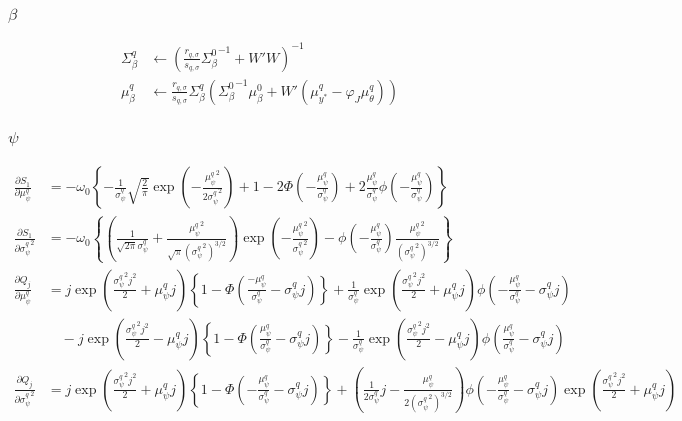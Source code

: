 \documentclass[11pt]{article}
\begin{document}
\subsubsection{$\beta$}
\begin{align*}
  \Sigma_{\beta}^{q} &\leftarrow \left(\frac{r_{q,\sigma}}{s_{q,\sigma}}{\Sigma_{\beta}^{0}}^{-1}+W'W \right)^{-1}\\
  \mu_{\beta}^{q} &\leftarrow \frac{r_{q,\sigma}}{s_{q,\sigma}}\Sigma_{\beta}^{q}\left({\Sigma_{\beta}^{0}}^{-1}\mu_{\beta}^{0}+W'\left(\mu_{y^*}^{q}-\varphi_{J}\mu_{\theta}^{q}\right)\right)
\end{align*}
\subsubsection{$\psi$}
\begin{align*}
  \frac{\partial S_{1}}{\partial \mu_{\psi}^{q}} &= -\omega_{0}\left\{-\frac{1}{\sigma_{\psi}^{q}}\sqrt{\frac{2}{\pi}}\exp\left(-\frac{{\mu_{\psi}^{q}}^{2}}{2{\sigma_{\psi}^{q}}^{2}} \right) + 1 -2\Phi\left(-\frac{\mu_{\psi}^{q}}{\sigma_{\psi}^{q}}\right)+2\frac{\mu_{\psi}^{q}}{\sigma_{\psi}^{q}}\phi\left(-\frac{\mu_{\psi}^{q}}{\sigma_{\psi}^{q}}\right) \right\}\\
  \frac{\partial S_{1}}{\partial {\sigma_{\psi}^{q}}^{2}} &= -\omega_{0}\left\{\left(\frac{1}{\sqrt{2\pi}\sigma_{\psi}^{q}}+\frac{{\mu_{\psi}^{q}}^{2}}{\sqrt{\pi}\left({\sigma_{\psi}^{q}}^{2} \right)^{3/2}} \right)\exp\left(-\frac{{\mu_{\psi}^{q}}^{2}}{{\sigma_{\psi}^{q}}^{2}} \right) -\phi\left(-\frac{\mu_{\psi}^{q}}{\sigma_{\psi}^{q}}\right)\frac{{\mu_{\psi}^{q}}^{2}}{\left({\sigma_{\psi}^{q}}^{2} \right)^{3/2}} \right\}\\
  \frac{\partial Q_{j}}{\partial \mu_{\psi}^{q}} &= j\exp\left(\frac{{\sigma_{\psi}^{q}}^{2}j^{2}}{2} +\mu_{\psi}^{q}j \right)\left\{1-\Phi\left(\frac{-\mu_{\psi}^{q}}{\sigma_{\psi}^{q}}-\sigma_{\psi}^{q}j\right) \right\}+\frac{1}{\sigma_{\psi}^{q}}\exp\left(\frac{{\sigma_{\psi}^{q}}^{2}j^{2}}{2}+\mu_{\psi}^{q}j \right)\phi\left(-\frac{\mu_{\psi}^{q}}{\sigma_{\psi}^{q}}-\sigma_{\psi}^{q}j\right)\\
  &\quad -j\exp\left(\frac{{\sigma_{\psi}^{q}}^{2}j^{2}}{2} -\mu_{\psi}^{q}j \right)\left\{1-\Phi\left(\frac{\mu_{\psi}^{q}}{\sigma_{\psi}^{q}}-\sigma_{\psi}^{q}j\right) \right\}-\frac{1}{\sigma_{\psi}^{q}}\exp\left(\frac{{\sigma_{\psi}^{q}}^{2}j^{2}}{2}-\mu_{\psi}^{q}j \right)\phi\left(\frac{\mu_{\psi}^{q}}{\sigma_{\psi}^{q}}-\sigma_{\psi}^{q}j\right)\\
  \frac{\partial Q_{j}}{\partial {\sigma_{\psi}^{q}}^{2}} &= j\exp\left(\frac{{\sigma_{\psi}^{q}}^{2}j^{2}}{2}+\mu_{\psi}^{q}j \right)\left\{1-\Phi\left(-\frac{\mu_{\psi}^{q}}{\sigma_{\psi}^{q}}-\sigma_{\psi}^{q}j\right) \right\}+\left(\frac{1}{2\sigma_{\psi}^{q}}j -\frac{\mu_{\psi}^{q}}{2\left({\sigma_{\psi}^{q}}^{2} \right)^{3/2}}\right)\phi\left(-\frac{\mu_{\psi}^{q}}{\sigma_{\psi}^{q}}-\sigma_{\psi}^{q}j\right)\exp\left(\frac{{\sigma_{\psi}^{q}}^{2}j^{2}}{2} +\mu_{\psi}^{q}j \right)\\

\end{align*}
\end{document}
